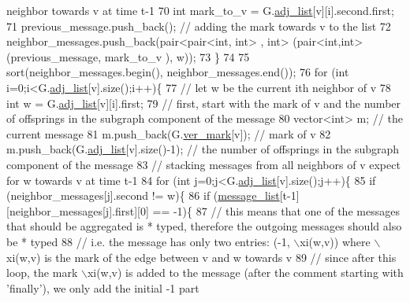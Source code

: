 \begin{DoxyCode}
{       neighbor towards v at time t-1}
70           \textcolor{keywordtype}{int} mark\_to\_v = G.\hyperlink{classmarked__graph_a1a0bf7ca413a278763f7c878b3b6fd6f}{adj\_list}[v][i].second.first;
71           previous\_message.push\_back(); \textcolor{comment}{// adding the mark towards v to the list}
72           neighbor\_messages.push\_back(pair<pair<int, int> , \textcolor{keywordtype}{int}> (pair<int,int>(previous\_message, mark\_to\_v
      ), w));
73         \}
74 
75         sort(neighbor\_messages.begin(), neighbor\_messages.end());
76         \textcolor{keywordflow}{for} (\textcolor{keywordtype}{int} i=0;i<G.\hyperlink{classmarked__graph_a1a0bf7ca413a278763f7c878b3b6fd6f}{adj\_list}[v].size();i++)\{
77           \textcolor{comment}{// let w be the current ith neighbor of v}
78           \textcolor{keywordtype}{int} w = G.\hyperlink{classmarked__graph_a1a0bf7ca413a278763f7c878b3b6fd6f}{adj\_list}[v][i].first;
79           \textcolor{comment}{// first, start with the mark of v and the number of offsprings in the subgraph component of the
       message}
80           vector<int> m; \textcolor{comment}{// the current message}
81           m.push\_back(G.\hyperlink{classmarked__graph_ac83e9377dd4d8bb95be1ac949b127296}{ver\_mark}[v]); \textcolor{comment}{// mark of v}
82           m.push\_back(G.\hyperlink{classmarked__graph_a1a0bf7ca413a278763f7c878b3b6fd6f}{adj\_list}[v].size()-1); \textcolor{comment}{// the number of offsprings in the subgraph
       component of the message}
83           \textcolor{comment}{// stacking messages from all neighbors of v expect for w towards v at time t-1}
84           \textcolor{keywordflow}{for} (\textcolor{keywordtype}{int} j=0;j<G.\hyperlink{classmarked__graph_a1a0bf7ca413a278763f7c878b3b6fd6f}{adj\_list}[v].size();j++)\{
85             \textcolor{keywordflow}{if} (neighbor\_messages[j].second != w)\{
86               \textcolor{keywordflow}{if} (\hyperlink{classgraph__message_aa17fdb629b423343edfafa97252763ef}{message\_list}[t-1][neighbor\_messages[j].first][0] == -1)\{
87                 \textcolor{comment}{// this means that one of the messages that should be aggregated is * typed, therefore the
       outgoing messages should also be * typed}
88                 \textcolor{comment}{// i.e. the message has only two entries: (-1, \(\backslash\)xi(w,v)) where \(\backslash\)xi(w,v) is the mark of the
       edge between v and w towards v}
89                 \textcolor{comment}{// since after this loop, the mark \(\backslash\)xi(w,v) is added to the message (after the comment
       starting with 'finally'), we only add the initial -1 part}

\end{DoxyCode}
